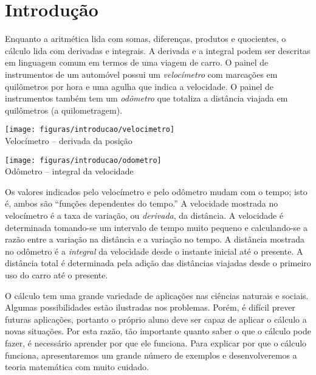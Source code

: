 \chapter*{Introdução}

Enquanto a aritmética lida com somas, diferenças, produtos e quocientes, o
cálculo lida com derivadas e integrais. A derivada e a integral podem
ser descritas em linguagem comum em termos de uma viagem de carro. O
painel de instrumentos de um automóvel possui um \emph{velocímetro}
com marcações em quilômetros por hora e uma agulha que indica a velocidade.
O painel de instrumentos também tem um \emph{odômetro} que totaliza a
distância viajada em quilômetros (a quilometragem).

\vspace{0.5\baselineskip}
\begin{minipage}{0.5\textwidth}
\begin{center}
\texttt{[image: figuras/introducao/velocimetro]}\\
Velocímetro -- derivada da posição
\end{center}
\end{minipage}%
\begin{minipage}{0.5\textwidth}
\begin{center}
\texttt{[image: figuras/introducao/odometro]}\\
Odômetro -- integral da velocidade
\end{center}
\end{minipage}
\vspace{0.5\baselineskip}

Os valores indicados pelo velocímetro e pelo odômetro mudam com o tempo;
isto é, ambos são ``funções dependentes do tempo.'' A velocidade mostrada
no velocímetro é a taxa de variação, ou \emph{derivada}, da distância.
A velocidade é determinada tomando-se um intervalo de tempo muito
pequeno e calculando-se a razão entre a variação na distância e a
variação no tempo. A distância mostrada no odômetro é a
\emph{integral} da velocidade desde o instante inicial até o presente. 
A distância total é determinada pela adição das distâncias viajadas desde
o primeiro uso do carro até o presente.

O cálculo tem uma grande variedade de aplicações nas ciências naturais e
sociais. Algumas possibilidades estão ilustradas nos problemas.
Porém, é difícil prever futuras aplicações, portanto o próprio aluno
deve ser capaz de aplicar o cálculo a novas situações. Por esta razão, tão
importante quanto saber o que o cálculo pode fazer, é necessário aprender
por que ele funciona.
Para explicar por que o cálculo funciona, apresentaremos um grande número
de exemplos e desenvolveremos a teoria matemática com muito cuidado.

